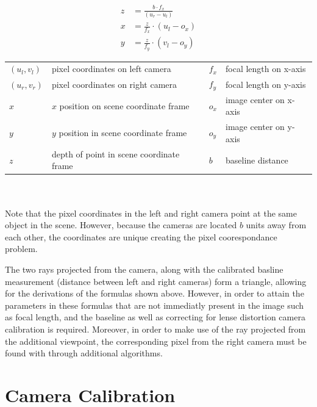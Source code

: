\documentclass[11pt]{scrartcl}
\begin{document}
\begin{theorem}

  \begin{align}
    z & = \displaystyle\frac{b\cdot f_x}{(u_r-u_l)} \\
    x & = \displaystyle\frac{z}{f_x} \cdot (u_l - o_x) \\
    y & = \displaystyle\frac{z}{f_y} \cdot (v_l - o_y) 
  \end{align}

  \begin{figurekey}
    \begin{tabular}{llll}
      $(u_l,v_l)$ & pixel coordinates on left camera     & $f_x$ & focal length on x-axis \\
      $(u_r,v_r)$ & pixel coordinates on right camera   & $f_y$ & focal length on y-axis \\
      $x$     & $x$ position on scene coordinate frame  & $o_x$ & image center on x-axis \\
      $y$     & $y$ position in scene coordinate frame   & $o_y$ & image center on y-axis \\
        $z$     & depth of point in scene coordinate frame  &$b$ & baseline distance \\
    \end{tabular}
  \end{figurekey} \\ \\
    Note that the pixel coordinates in the left and right camera point at the same object in 
    the scene. However, because the cameras are located $b$ units away from each other, 
    the coordinates are unique creating the pixel coorespondance problem. 
\end{theorem}

The two rays projected from the camera, along with the calibrated basline measurement (distance
between left and right cameras) form a triangle, allowing for the derivations of the formulas
shown above. However, in order to attain the parameters in these formulas that are not 
immediatly present in the image such as focal length, and the baseline as well as correcting
for lense distortion camera calibration is required. Moreover, in order to make use of the ray 
projected from the additional viewpoint, the corresponding pixel from the right camera must be 
found with through additional algorithms. 


\section{Camera Calibration}
\end{document}
